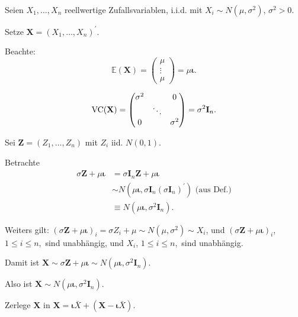 \documentclass{tstextbook}
\begin{document}
\begin{example}
	
	Seien $X_{1},\ldots,X_{n}$ reellwertige Zufallsvariablen, i.i.d. mit
	$X_{i}\sim N\left(\mu,\sigma^{2}\right),\,\sigma^{2}>0.$
	
	Setze $\mathbf{X}=\left(X_{1},\ldots,X_{n}\right)^{\prime}.$ 
	
	Beachte: 
	\[
	\mathbb{E}(\mathbf{X})=\begin{pmatrix}\mu\\
		\vdots\\
		\mu
	\end{pmatrix}=\mu\boldsymbol{\iota}.
	\]
	
	\[
	\operatorname{VC}(\mathbf{X})=\begin{pmatrix}\sigma^{2} &  & 0\\
		& \ddots\\
		0 &  & \sigma^{2}
	\end{pmatrix}=\sigma^{2}\mathbf{I}_{n}.
	\]
	
	
	Sei $\mathbf{Z}=\left(Z_{1},\ldots,Z_{n}\right)$ mit $Z_{i}$ iid. $N(0,1).$
	
	Betrachte
	\begin{align*}
		\sigma \mathbf{Z}+\mu\boldsymbol{\iota} & =\sigma \mathbf{I}_{n}\mathbf{Z}+\mu\boldsymbol{\iota}\\
		& \sim N\left(\mu\boldsymbol{\iota},\sigma \mathbf{I}_{n}\left(\sigma \mathbf{I}_{n}\right)^{\prime}\right)\text{ (aus Def.)}\\
		& \equiv N\left(\mu\boldsymbol{\iota},\sigma^{2}\mathbf{I}_{n}\right).
	\end{align*}
	
	Weiters gilt: $(\sigma \mathbf{Z}+\mu\boldsymbol{\iota})_{i}=\sigma Z_{i}+\mu\sim N\left(\mu,\sigma^{2}\right)\sim X_{i}$, und $(\sigma \mathbf{Z}+\mu\boldsymbol{\iota})_{i}$, $1\le i\le n,$ sind unabhängig, und $X_{i}$, $1\le i\le n,$ sind unabhängig.
	
	Damit ist $\mathbf{X}\sim\sigma \mathbf{Z}+\mu\boldsymbol{\iota}\sim N\left(\mu\boldsymbol{\iota},\sigma^{2}\mathbf{I}_{n}\right).$
	
	Also ist $\mathbf{X}\sim N\left(\mu\boldsymbol{\iota},\sigma^{2}\mathbf{I}_{n}\right).$
	
	Zerlege $\mathbf{X}$ in $\mathbf{X}=\boldsymbol{\iota}\bar{X}+\left(\mathbf{X}-\boldsymbol{\iota}\bar{X}\right)$.
	

\end{example}
\end{document}
